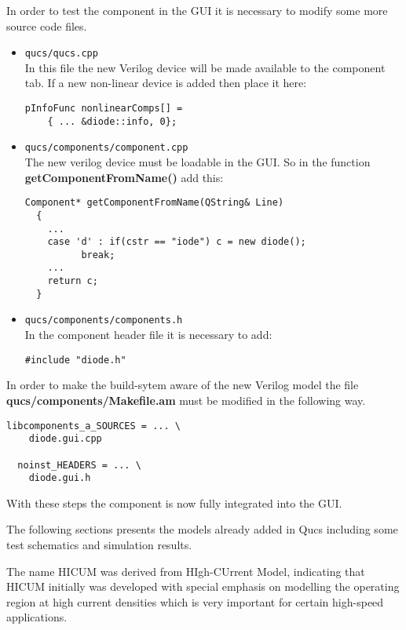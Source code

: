 In order to test the component in the GUI it is necessary to modify
some more source code files.
\begin{itemize}
\item \Verb+qucs/qucs.cpp+\\
In this file the new Verilog device will be made available to the
component tab.  If a new non-linear device is added then place it here:
\begin{Verbatim}[fontsize=\small]
  pInfoFunc nonlinearComps[] =
    { ... &diode::info, 0};
\end{Verbatim}
\item \Verb+qucs/components/component.cpp+\\
The new verilog device must be loadable in the GUI.  So in the function
\textbf{getComponentFromName()} add this:
\begin{Verbatim}[fontsize=\small]
  Component* getComponentFromName(QString& Line)
  {
    ...
    case 'd' : if(cstr == "iode") c = new diode();
          break;
    ...
    return c;
  }
\end{Verbatim}
\item \Verb+qucs/components/components.h+\\
In the component header file it is necessary to add:
\begin{Verbatim}[fontsize=\small]
  #include "diode.h"
\end{Verbatim}
\end{itemize}

In order to make the build-sytem aware of the new Verilog model the
file \textbf{qucs/components/Makefile.am} must be modified in the
following way.
\begin{Verbatim}[fontsize=\small]
  libcomponents_a_SOURCES = ... \
    diode.gui.cpp

  noinst_HEADERS = ... \
    diode.gui.h
\end{Verbatim}

With these steps the component is now fully integrated into the GUI.  

\tutsection{Implemented devices}

The following sections presents the models already added in Qucs
including some test schematics and simulation results.


The name HICUM was derived from HIgh-CUrrent Model, indicating that
HICUM initially was developed with special emphasis on modelling the
operating region at high current densities which is very important for
certain high-speed applications.

